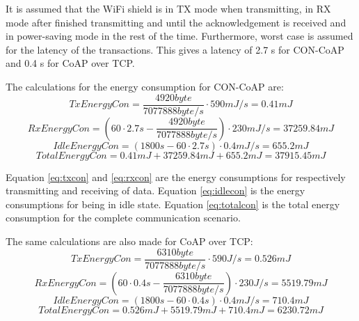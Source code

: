 It is assumed that the WiFi shield is in TX mode when transmitting, in RX mode after finished transmitting and until the acknowledgement is received and in power-saving mode in the rest of the time. Furthermore, worst case is assumed for the latency of the transactions. This gives a latency of 2.7 s for CON-CoAP and 0.4 s for CoAP over TCP.


The calculations for the energy consumption for CON-CoAP are:
\begin{equation}\label{eq:txcon}
TxEnergyCon = \frac{4920 byte}{7077888 byte/s } \cdot 590 mJ/s = 0.41 mJ   
\end{equation}
\begin{equation}\label{eq:rxcon}
RxEnergyCon = (60 \cdot 2.7 s - \frac{4920 byte}{7077888 byte/s }) \cdot 230 mJ/s = 37259.84 mJ   
\end{equation}
\begin{equation}\label{eq:idlecon}
IdleEnergyCon = (1800 s - 60 \cdot 2.7 s) \cdot 0.4 mJ/s = 655.2 mJ   
\end{equation}
\begin{equation}\label{eq:totalcon}
TotalEnergyCon = 0.41 mJ + 37259.84 mJ +655.2 mJ = 37915.45 mJ %
\end{equation}

Equation \ref{eq:txcon} and \ref{eq:rxcon} are the energy consumptions for respectively transmitting and receiving of data. Equation \ref{eq:idlecon} is the energy consumptions for being in idle state.
Equation \ref{eq:totalcon} is the total energy consumption for the complete communication scenario.

The same calculations are also made for CoAP over TCP:
\begin{equation}\label{eq:txtcp}
TxEnergyCon = \frac{6310 byte}{7077888 byte/s } \cdot 590 J/s = 0.526 mJ   
\end{equation}
\begin{equation}\label{eq:rxtcp}
RxEnergyCon = (60 \cdot 0.4 s - \frac{6310 byte}{7077888 byte/s }) \cdot 230 J/s = 5519.79 mJ   
\end{equation}
\begin{equation}\label{eq:idletcp}
IdleEnergyCon = (1800 s - 60 \cdot 0.4 s) \cdot 0.4 mJ/s = 710.4 mJ %
\end{equation}
\begin{equation}\label{eq:totaltcp}
TotalEnergyCon = 0.526 mJ + 5519.79 mJ + 710.4 mJ = 6230.72 mJ 
\end{equation}

